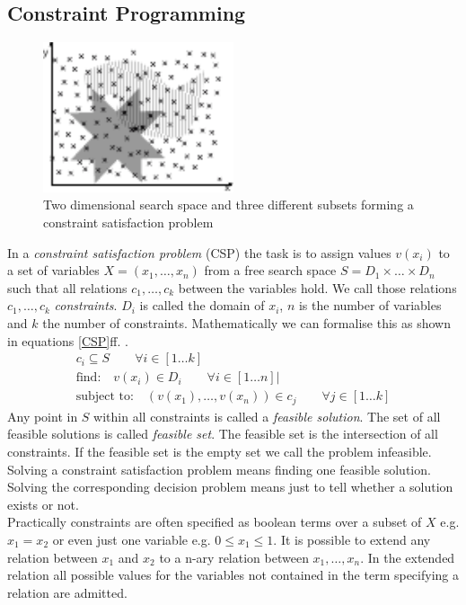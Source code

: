 \subsection{Constraint Programming}
\begin{figure}
\label{fig:CSPExample}
\includegraphics[width=0.5\textwidth]{./pics/SetIntersection.pdf}
\caption{Two dimensional search space and three different subsets forming a constraint satisfaction problem}
\end{figure}
In a \emph{constraint satisfaction problem} (CSP) the task is to assign values $v(x_i)$ to a set of variables $X = (x_1, \dots , x_n)$ from a free search space $S=D_1\times \dots \times D_n$ such that all relations $c_1,\dots,c_k$ between the variables hold. We call those relations $c_1,\dots,c_k$ \emph{constraints}. $D_i$ is called the domain of $x_i$, $n$ is the number of variables and $k$ the number of constraints. Mathematically we can formalise this as shown in equations \ref{CSP}ff. \cite{Eiben97constraintsatisfaction}\cite{wiki:CSP}.
\begin{eqnarray} 
\label{CSP}
c_i \subseteq S \qquad\forall i \in \left[ 1 \dots k \right]\\
\text{find:} \quad v(x_i) \in D_i \qquad\forall i \in \left[ 1 \dots n \right]| \\
\text{subject to:} \quad (v(x_1),\dots , v(x_n)) \in c_j\qquad\forall j \in \left[1 \dots k\right]
\end{eqnarray} 
Any point in $S$ within all constraints is called a \emph{feasible solution}. The set of all feasible solutions is called \emph{feasible set}. The feasible set is the intersection of all constraints. If the feasible set is the empty set we call the problem infeasible. Solving a constraint satisfaction problem means finding one feasible solution. Solving the corresponding decision problem means just to tell whether a solution exists or not. \\
Practically constraints are often specified as boolean terms over a subset of $X$ e.g. $x_1=x_2$ or even just one variable e.g. $0\leq x_1 \leq 1$. It is possible to extend any relation between $x_1$ and $x_2$ to a n-ary relation between $x_1,\dots,x_n$. In the extended relation all possible values for the variables not contained in the term specifying a relation are admitted.\\
